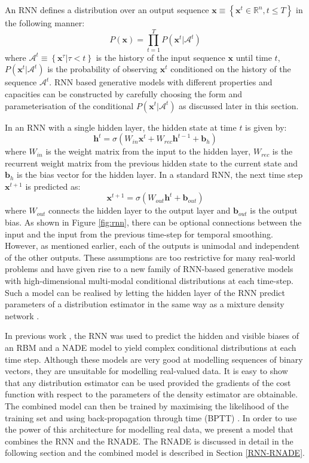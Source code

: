 \documentclass{article} %
\begin{document}
An RNN defines a distribution over an output sequence $ \mathbf{x} \equiv \left\{ \mathbf{x}^t \in \mathbb{R}^n, t \leq T \right\}$ in the following manner:
$$ P(\mathbf{x}) = \prod_{t=1}^{T} P(\mathbf{x}^t|\mathcal{A}^t)$$
where $\mathcal{A}^t \equiv \left\{ \mathbf{x}^{\tau}|\tau < t \right\}$ is the history of the input sequence $\mathbf{x}$ until time $t$, $P(\mathbf{x}^t|\mathcal{A}^t)$ is the probability of observing $\mathbf{x}^t$ conditioned on the history of the sequence $\mathcal{A}^t$. RNN based generative models with different properties and capacities can be constructed by carefully choosing the form and parameterisation of the conditional $P(\mathbf{x}^t|\mathcal{A}^t)$ as discussed later in this section. 

In an RNN with a single hidden layer, the hidden state at time $t$ is given by:
\begin{equation}
\label{rnn-hidden}
\mathbf{h}^t = \sigma{(W_{in}\mathbf{x}^t + W_{rec}\mathbf{h}^{t-1} + \mathbf{b}_h)}
\end{equation}
where $W_{in}$ is the weight matrix from the input to the hidden layer, $W_{rec}$ is the recurrent weight matrix from the previous hidden state to the current state and $\mathbf{b}_h$ is the bias vector for the hidden layer. In a standard RNN, the next time step $\mathbf{x}^{t+1}$ is predicted as:
$$ \mathbf{x}^{t+1} = \sigma{(W_{out}\mathbf{h}^{t} + \mathbf{b}_{out})}$$  
where $W_{out}$ connects the hidden layer to the output layer and $\mathbf{b}_{out}$ is the output bias. As shown in Figure \ref{fig:rnn}, there can be optional connections between the input and the input from the previous time-step for temporal smoothing. However, as mentioned earlier, each of the outputs is unimodal and independent of the other outputs. These assumptions are too restrictive for many real-world problems and have given rise to a new family of RNN-based generative models with high-dimensional multi-modal conditional distributions at each time-step. Such a model can be realised by letting the hidden layer of the RNN predict parameters of a distribution estimator in the same way as a mixture density network \cite{bishop1994mixture}.  

In previous work \cite{Boulanger-Lewandowski2012}, the RNN was used to predict the hidden and visible biases of an RBM and a NADE model to yield complex conditional distributions at each time step. Although these models are very good at modelling sequences of binary vectors, they are unsuitable for modelling real-valued data. It is easy to show that any distribution estimator can be used provided the gradients of the cost function with respect to the parameters of the density estimator are obtainable. The combined model can then be trained by maximising the likelihood of the training set and using back-propagation through time (BPTT) \cite{rumelhart1985learning}. In order to use the power of this architecture for modelling real data, we present a model that combines the RNN and the RNADE. The RNADE is discussed in detail in the following section and the combined model is described in Section \ref{RNN-RNADE}. 
\end{document}
